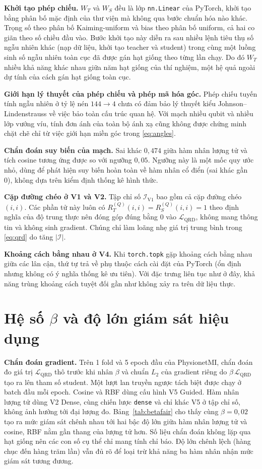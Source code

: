 \textbf{Khởi tạo phép chiếu.} $W_T$ và $W_S$ đều là lớp \texttt{nn.Linear} của PyTorch, khởi tạo bằng
phân bố mặc định của thư viện mà không qua bước chuẩn hóa nào khác. Trọng số
theo phân bố Kaiming-uniform và bias theo phân bố uniform, cả hai co giãn
theo số chiều đầu vào. Bước khởi tạo này diễn ra sau nhiều lệnh tiêu thụ số
ngẫu nhiên khác (nạp dữ liệu, khởi tạo teacher và student) trong cùng một
luồng sinh số ngẫu nhiên toàn cục đã được gán hạt giống theo từng lần
chạy. Do đó $W_T$ nhiều khả năng khác nhau giữa năm hạt giống của thí
nghiệm, một hệ quả ngoài dự tính của cách gán hạt giống toàn cục.

\textbf{Giới hạn lý thuyết của phép chiếu và phép mã hóa góc.} Phép chiếu
tuyến tính ngẫu nhiên ở tỷ lệ nén $144 \to 4$ chưa có đảm bảo lý thuyết kiểu
Johnson--Lindenstrauss về việc bảo toàn cấu trúc quan hệ. Với mạch nhiều
qubit và nhiều lớp vướng víu, tính đơn ánh của toàn bộ ánh xạ cũng không
được chứng minh chặt chẽ chỉ từ việc giới hạn miền góc trong
\eqref{eq:angles}.

\textbf{Chẩn đoán suy biến của mạch.} Sai khác $0{,}474$ giữa hàm nhân
lượng tử và tích cosine tương ứng được so với ngưỡng $0{,}05$. Ngưỡng này là
một mốc quy ước nhỏ, dùng để phát hiện suy biến hoàn toàn về hàm nhân cổ
điển (sai khác gần 0), không dựa trên kiểm định thống kê hình thức.

\textbf{Cặp đường chéo ở V1 và V2.} Tập chỉ số $\mathcal{I}_{\mathrm{V1}}$
bao gồm cả cặp đường chéo $(i,i)$. Các phần tử này luôn có
$R_T^{(Q)}(i,i) = R_S^{(Q)}(i,i) = 1$ theo định nghĩa của độ trung thực nên
đóng góp đúng bằng 0 vào $\mathcal{L}_{\mathrm{QRD}}$, không mang thông tin
và không sinh gradient. Chúng chỉ làm loãng nhẹ giá trị trung bình trong
\eqref{eq:qrd} do tăng $|\mathcal{I}|$.

\textbf{Khoảng cách bằng nhau ở V4.} Khi \texttt{torch.topk} gặp khoảng
cách bằng nhau giữa các lân cận, thứ tự trả về phụ thuộc cách cài đặt của
PyTorch (ổn định nhưng không có ý nghĩa thống kê ưu tiên). Với đặc trưng
liên tục như ở đây, khả năng trùng khoảng cách tuyệt đối gần như không xảy
ra trên dữ liệu thực.

\section{Hệ số $\beta$ và độ lớn giám sát hiệu dụng}
\label{app:kiemsoat}

\textbf{Chẩn đoán gradient.} Trên 1 fold và 5 epoch đầu của PhysionetMI, chẩn đoán đo giá trị
$\mathcal{L}_{\mathrm{QRD}}$ thô trước khi nhân $\beta$ và chuẩn $L_2$ của
gradient riêng do $\beta\,\mathcal{L}_{\mathrm{QRD}}$ tạo ra lên tham số
student. Một lượt lan truyền ngược tách biệt được chạy ở batch đầu mỗi
epoch. Cosine và RBF dùng cấu hình V5 Guided. Hàm nhân lượng tử
dùng V2 Dense, cùng chiến lược \texttt{dense} và chỉ khác V5 ở tập chỉ số,
không ảnh hưởng tới đại lượng đo. Bảng~\ref{tab:betafair} cho thấy cùng
$\beta = 0{,}02$ tạo ra mức giám sát chênh nhau tới hai bậc độ lớn giữa hàm
nhân lượng tử và cosine, RBF nằm gần thang của lượng tử hơn. Số liệu chẩn đoán
không lặp qua hạt giống nên các con số cụ thể chỉ mang tính chỉ báo. Độ
lớn chênh lệch (hàng chục đến hàng trăm lần) vẫn đủ rõ để loại trừ khả năng ba hàm
nhân nhận mức giám sát tương đương.

